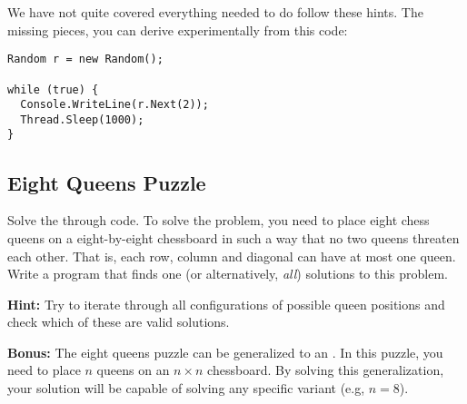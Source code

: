 We have not quite covered everything needed to do follow these hints. The missing pieces, you can derive experimentally from this code:

\begin{verbatim}
Random r = new Random();

while (true) {
  Console.WriteLine(r.Next(2));
  Thread.Sleep(1000);
}
\end{verbatim}

\subsection{Eight Queens Puzzle}

Solve the  through code. To solve the problem, you need to place eight chess queens on a eight-by-eight chessboard in such a way that no two queens threaten each other. That is, each row, column and diagonal can have at most one queen. Write a program that finds one (or alternatively, \textsl{all}) solutions to this problem.

\textbf{Hint:} Try to iterate through all configurations of possible queen positions and check which of these are valid solutions.

\textbf{Bonus:} The eight queens puzzle can be generalized to an . In this puzzle, you need to place $n$ queens on an $n \times n$ chessboard. By solving this generalization, your solution will be capable of solving any specific variant (e.g, $n=8$).

